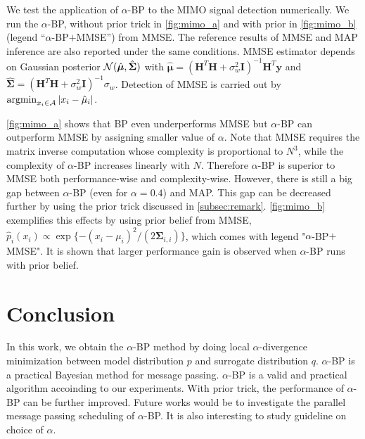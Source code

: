 \documentclass[conference]{IEEEtran}
\begin{document}
We test the application of $\alpha$-BP to the MIMO signal detection numerically. We run the $\alpha$-BP, without prior trick in \autoref{fig:mimo_a} and with prior in \autoref{fig:mimo_b} (legend ``$\alpha$-BP$+$MMSE'') from MMSE. The reference results of MMSE and MAP inference are also reported under the same conditions. MMSE estimator depends on Gaussian posterior $\mathcal{N}(\hat{\bm{\mu}}, \hat{\bm{\Sigma}})$ with $\hat{\bm{\mu}} = (\bm{H}^{T}\bm{H} + \sigma_w^2 \bm{I})^{-1}\bm{H}^{T}\bm{y}$ and $\hat{\bm{\Sigma}} = (\bm{H}^{T}\bm{H} + \sigma_w^2 \bm{I})^{-1}\sigma_w$. Detection of MMSE is carried out by $\operatorname{argmin}_{x_i\in \mathcal{A}}| x_i-\hat{\mu}_i |$.%

\autoref{fig:mimo_a} shows that BP even underperforms MMSE but $\alpha$-BP can outperform MMSE by assigning smaller value of $\alpha$.
Note that MMSE requires the matrix inverse computation whose complexity is proportional to $N^3$, while the complexity of $\alpha$-BP increases linearly with $N$. Therefore $\alpha$-BP is superior to MMSE both performance-wise and complexity-wise.  
However, there is still a big gap between $\alpha$-BP (even for $\alpha=0.4$) and MAP. This gap can be decreased further by using the prior trick discussed in \autoref{subsec:remark}. \autoref{fig:mimo_b} exemplifies this effects by using prior belief from MMSE, $\hat{p}_i(x_i)\propto \exp\{-(x_i-\mu_i)^2/(2\bm{\Sigma}_{i,i})\}$, which comes with legend "$\alpha$-BP$+$MMSE". It is shown that larger performance gain is observed when $\alpha$-BP runs with prior belief.

\section{Conclusion}
In this work, we obtain the $\alpha$-BP method by doing local $\alpha$-divergence minimization between model distribution $p$ and surrogate distribution $q$. $\alpha$-BP is a practical Bayesian method for message passing. $\alpha$-BP is a valid and practical algorithm accoinding to our experiments. With prior trick, the performance of $\alpha$-BP can be further improved. Future works would be to investigate the parallel message passing scheduling of $\alpha$-BP. It is also interesting to study guideline on choice of $\alpha$.



% 



% 
\end{document}
